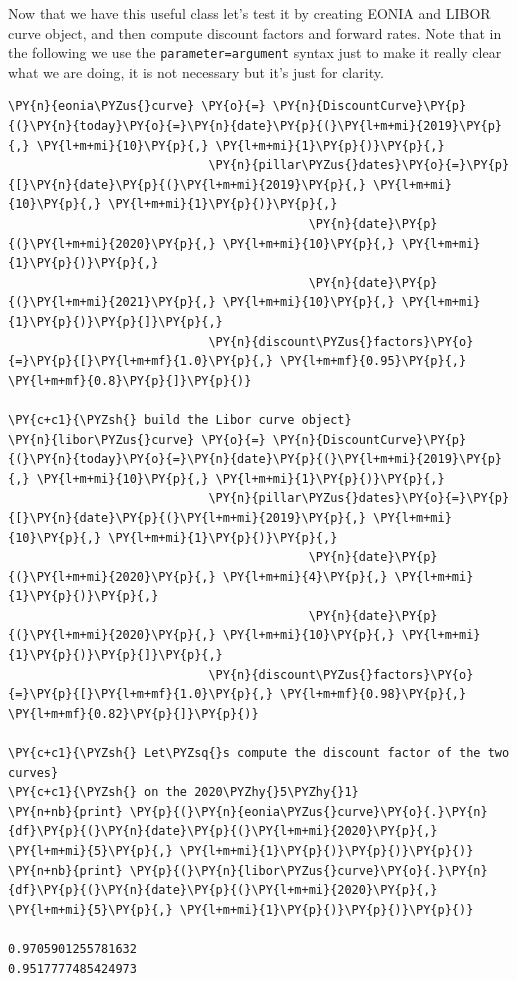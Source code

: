 Now that we have this useful class let's test it by creating EONIA and LIBOR curve object, and then compute discount factors and forward rates. Note that in the following we use the \texttt{parameter=argument} syntax just to make it really clear what we are doing, it is not necessary but it's just for clarity.

\begin{tcolorbox}[breakable, size=fbox, boxrule=1pt, pad at break*=1mm,colback=cellbackground, colframe=cellborder]
\begin{Verbatim}[commandchars=\\\{\}]
\PY{n}{eonia\PYZus{}curve} \PY{o}{=} \PY{n}{DiscountCurve}\PY{p}{(}\PY{n}{today}\PY{o}{=}\PY{n}{date}\PY{p}{(}\PY{l+m+mi}{2019}\PY{p}{,} \PY{l+m+mi}{10}\PY{p}{,} \PY{l+m+mi}{1}\PY{p}{)}\PY{p}{,}
                            \PY{n}{pillar\PYZus{}dates}\PY{o}{=}\PY{p}{[}\PY{n}{date}\PY{p}{(}\PY{l+m+mi}{2019}\PY{p}{,} \PY{l+m+mi}{10}\PY{p}{,} \PY{l+m+mi}{1}\PY{p}{)}\PY{p}{,} 
                                          \PY{n}{date}\PY{p}{(}\PY{l+m+mi}{2020}\PY{p}{,} \PY{l+m+mi}{10}\PY{p}{,} \PY{l+m+mi}{1}\PY{p}{)}\PY{p}{,} 
                                          \PY{n}{date}\PY{p}{(}\PY{l+m+mi}{2021}\PY{p}{,} \PY{l+m+mi}{10}\PY{p}{,} \PY{l+m+mi}{1}\PY{p}{)}\PY{p}{]}\PY{p}{,}
                            \PY{n}{discount\PYZus{}factors}\PY{o}{=}\PY{p}{[}\PY{l+m+mf}{1.0}\PY{p}{,} \PY{l+m+mf}{0.95}\PY{p}{,} \PY{l+m+mf}{0.8}\PY{p}{]}\PY{p}{)}
        
\PY{c+c1}{\PYZsh{} build the Libor curve object}
\PY{n}{libor\PYZus{}curve} \PY{o}{=} \PY{n}{DiscountCurve}\PY{p}{(}\PY{n}{today}\PY{o}{=}\PY{n}{date}\PY{p}{(}\PY{l+m+mi}{2019}\PY{p}{,} \PY{l+m+mi}{10}\PY{p}{,} \PY{l+m+mi}{1}\PY{p}{)}\PY{p}{,}
                            \PY{n}{pillar\PYZus{}dates}\PY{o}{=}\PY{p}{[}\PY{n}{date}\PY{p}{(}\PY{l+m+mi}{2019}\PY{p}{,} \PY{l+m+mi}{10}\PY{p}{,} \PY{l+m+mi}{1}\PY{p}{)}\PY{p}{,} 
                                          \PY{n}{date}\PY{p}{(}\PY{l+m+mi}{2020}\PY{p}{,} \PY{l+m+mi}{4}\PY{p}{,} \PY{l+m+mi}{1}\PY{p}{)}\PY{p}{,} 
                                          \PY{n}{date}\PY{p}{(}\PY{l+m+mi}{2020}\PY{p}{,} \PY{l+m+mi}{10}\PY{p}{,} \PY{l+m+mi}{1}\PY{p}{)}\PY{p}{]}\PY{p}{,}
                            \PY{n}{discount\PYZus{}factors}\PY{o}{=}\PY{p}{[}\PY{l+m+mf}{1.0}\PY{p}{,} \PY{l+m+mf}{0.98}\PY{p}{,} \PY{l+m+mf}{0.82}\PY{p}{]}\PY{p}{)}

\PY{c+c1}{\PYZsh{} Let\PYZsq{}s compute the discount factor of the two curves}
\PY{c+c1}{\PYZsh{} on the 2020\PYZhy{}5\PYZhy{}1}
\PY{n+nb}{print} \PY{p}{(}\PY{n}{eonia\PYZus{}curve}\PY{o}{.}\PY{n}{df}\PY{p}{(}\PY{n}{date}\PY{p}{(}\PY{l+m+mi}{2020}\PY{p}{,} \PY{l+m+mi}{5}\PY{p}{,} \PY{l+m+mi}{1}\PY{p}{)}\PY{p}{)}\PY{p}{)}
\PY{n+nb}{print} \PY{p}{(}\PY{n}{libor\PYZus{}curve}\PY{o}{.}\PY{n}{df}\PY{p}{(}\PY{n}{date}\PY{p}{(}\PY{l+m+mi}{2020}\PY{p}{,} \PY{l+m+mi}{5}\PY{p}{,} \PY{l+m+mi}{1}\PY{p}{)}\PY{p}{)}\PY{p}{)}

0.9705901255781632
0.9517777485424973
\end{Verbatim}
\end{tcolorbox}

